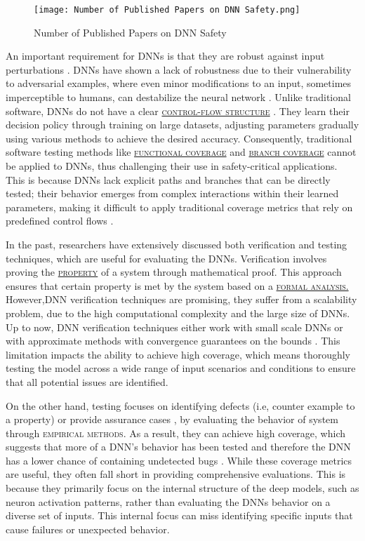 \begin{figure*}
  \centering
  \texttt{[image: Number of Published Papers on DNN Safety.png]}
  \caption{Number of Published Papers on DNN Safety}
  \label{fig:no_publish}
\end{figure*}

An important requirement for DNNs is that they are robust against input perturbations \cite{HuangX}. 
DNNs have shown a lack of robustness due to their vulnerability to adversarial examples, where even minor modifications to an input, sometimes imperceptible to humans, can destabilize the neural network  \cite{Goodfellow,Carlini}. Unlike traditional software, DNNs do not have a clear \hyperref[gloss]{\textsc{control-flow structure}} \label{Control-Flow Structure}. They learn their decision policy through training on large datasets, adjusting parameters gradually using various methods to achieve the desired accuracy. Consequently, traditional software testing methods like \hyperref[gloss]{\textsc{functional coverage}} \label{Functional coverage} and \hyperref[gloss]{\textsc{branch coverage}} \label{Branch coverage}  cannot be applied to DNNs, thus challenging their use in safety-critical applications. This is because DNNs lack explicit paths and branches that can be directly tested; their behavior emerges from complex interactions within their learned parameters, making it difficult to apply traditional coverage metrics that rely on predefined control flows \cite{Sekhon}.


In the past, researchers have extensively discussed both verification and testing techniques, which are useful for evaluating the DNNs. Verification involves proving the \hyperref[gloss]{\textsc{property}} \label{property} of a system through mathematical proof. This approach ensures that certain property is met by the system based on a \hyperref[gloss]{\textsc{formal analysis.}} \label{formal analysis} However,DNN verification techniques are promising, they suffer from a scalability problem, due to the high computational complexity and the large size of DNNs. Up to now, DNN verification techniques either work with small scale DNNs or with approximate methods with convergence guarantees on the bounds \cite{HuangX}. This limitation impacts the ability to achieve high coverage, which means thoroughly testing the model across a wide range of input scenarios and conditions to ensure that all potential issues are identified.

On the other hand, testing focuses on identifying defects (i.e, counter example to a property) or provide assurance cases \cite {Rushby}, by evaluating the behavior of system through {\textsc{empirical methods.}} \label{empirical methods} As a result, they can achieve high coverage, which suggests that more of a DNN's behavior has been tested and therefore the DNN has a lower chance of containing undetected bugs \cite{HuangX}. While these coverage metrics are useful, they often fall short in providing comprehensive evaluations. This is because they primarily focus on the internal structure of the deep models, such as neuron activation patterns, rather than evaluating the DNNs behavior on a diverse set of inputs. This internal focus can miss identifying specific inputs that cause failures or unexpected behavior.


